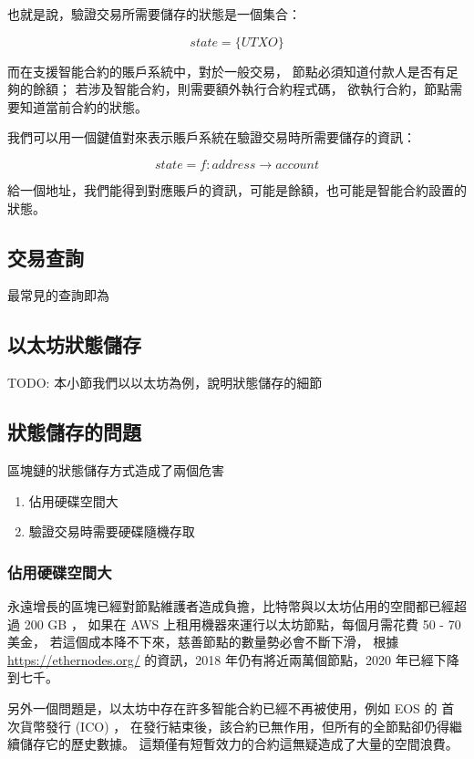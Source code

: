 也就是說，驗證交易所需要儲存的狀態是一個集合：

\[state = \{UTXO\}\]

而在支援智能合約的賬戶系統中，對於一般交易，
節點必須知道付款人是否有足夠的餘額；
若涉及智能合約，則需要額外執行合約程式碼，
欲執行合約，節點需要知道當前合約的狀態。

我們可以用一個鍵值對來表示賬戶系統在驗證交易時所需要儲存的資訊：

\[state = f: address\to account \]

給一個地址，我們能得到對應賬戶的資訊，可能是餘額，也可能是智能合約設置的狀態。

\subsection{交易查詢}

最常見的查詢即為

\subsection{以太坊狀態儲存}

TODO: 本小節我們以以太坊為例，說明狀態儲存的細節

\subsection{狀態儲存的問題}

區塊鏈的狀態儲存方式造成了兩個危害

\begin{enumerate}
  \item 佔用硬碟空間大
  \item 驗證交易時需要硬碟隨機存取
\end{enumerate}

\subsubsection{佔用硬碟空間大}

永遠增長的區塊已經對節點維護者造成負擔，比特幣與以太坊佔用的空間都已經超過 200 GB ，
如果在 AWS 上租用機器來運行以太坊節點，每個月需花費 50 - 70 美金，
若這個成本降不下來，慈善節點的數量勢必會不斷下滑，
根據 \url{https://ethernodes.org/} 的資訊，2018 年仍有將近兩萬個節點，2020 年已經下降到七千。

另外一個問題是，以太坊中存在許多智能合約已經不再被使用，例如 EOS 的 首次貨幣發行 (ICO) ，
在發行結束後，該合約已無作用，但所有的全節點卻仍得繼續儲存它的歷史數據。
這類僅有短暫效力的合約這無疑造成了大量的空間浪費。

